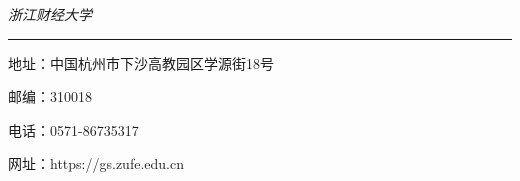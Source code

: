 
\clearpage
\thispagestyle{empty}
\setlength{\parskip}{0pt}
\vspace*{163mm}

{\setlength{\parindent}{17mm}%
 \songti\itshape{}%
 浙\hspace{\ccwd}江\hspace{\ccwd}财\hspace{\ccwd}经\hspace{\ccwd}大\hspace{\ccwd}学\par}

\vspace{2mm}
\noindent\rule{\textwidth}{0.4pt}

\vspace{5mm}

{\setlength{\parindent}{5mm}%
 \kaishu{}%
 地\hspace{0.5em}址：中国杭州市下沙高教园区学源街18号\par
 邮\hspace{0.5em}编：310018\par
 电\hspace{0.5em}话：0571-86735317\par
 网\hspace{0.5em}址：https://gs.zufe.edu.cn\par}
